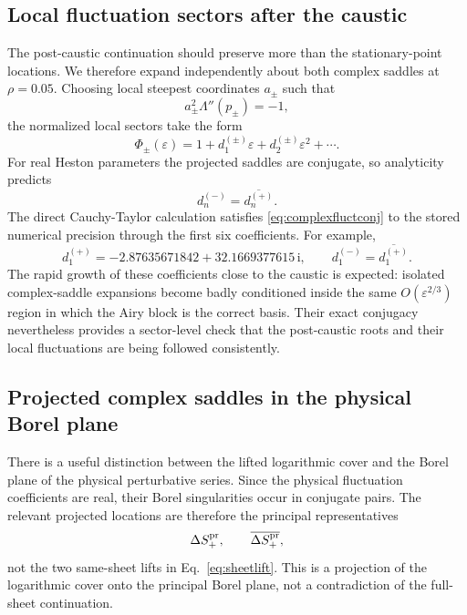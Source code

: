 \documentclass[11pt]{article}
\newcommand{\ii}{\mathrm i}
\begin{document}
\subsection{Local fluctuation sectors after the caustic}
The post-caustic continuation should preserve more than the stationary-point locations.  We therefore expand independently about both complex saddles at $\rho=0.05$.  Choosing local steepest coordinates $a_\pm$ such that
\begin{equation}
 a_\pm^2\Lambda''(p_\pm)=-1,
\end{equation}
the normalized local sectors take the form
\begin{equation}
 \Phi_\pm(\varepsilon)=1+d_1^{(\pm)}\varepsilon+d_2^{(\pm)}\varepsilon^2+\cdots.
\end{equation}
For real Heston parameters the projected saddles are conjugate, so analyticity predicts
\begin{equation}
 d_n^{(-)}=\overline{d_n^{(+)}}.
 \label{eq:complexfluctconj}
\end{equation}
The direct Cauchy-Taylor calculation satisfies \eqref{eq:complexfluctconj} to the stored numerical precision through the first six coefficients.  For example,
\begin{equation}
 d_1^{(+)}=-2.87635671842+32.1669377615\,\ii,
 \qquad
 d_1^{(-)}=\overline{d_1^{(+)}}.
\end{equation}
The rapid growth of these coefficients close to the caustic is expected: isolated complex-saddle expansions become badly conditioned inside the same $O(\varepsilon^{2/3})$ region in which the Airy block is the correct basis.  Their exact conjugacy nevertheless provides a sector-level check that the post-caustic roots and their local fluctuations are being followed consistently.

\subsection{Projected complex saddles in the physical Borel plane}
There is a useful distinction between the lifted logarithmic cover and the Borel plane of the physical perturbative series.  Since the physical fluctuation coefficients are real, their Borel singularities occur in conjugate pairs.  The relevant projected locations are therefore the principal representatives
\begin{equation}
 \Delta S_+^{\rm pr},
 \qquad
 \overline{\Delta S_+^{\rm pr}},
\end{equation}
not the two same-sheet lifts in Eq.~\eqref{eq:sheetlift}.  This is a projection of the logarithmic cover onto the principal Borel plane, not a contradiction of the full-sheet continuation.
\end{document}
